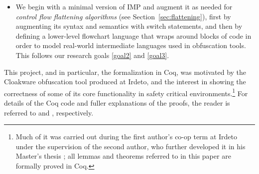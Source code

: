 \documentclass[compsoc,conference,a4paper,10pt,times]{IEEEtran}
\begin{document}
\begin{itemize}
   \item We begin with a minimal version of IMP and augment it as needed for \emph{control flow flattening algorithms} (see Section~\ref{sec:flattening}),
   first by augmenting its syntax and semantics with switch statements, and then by defining a lower-level flowchart language that wraps around blocks of code in order to model real-world intermediate languages used in obfuscation tools. This follows our research goals \ref{goal2} and \ref{goal3}. \label{itm:3}
\end{itemize}

This project, and in particular, the formalization in Coq, was motivated by the Cloakware obfuscation tool produced at Irdeto, and the interest in showing the correctness of some of its core functionality in safety critical environments.\footnote{Much of it was carried out during the first author's co-op term at Irdeto under the supervision of the second author, who further developed it in his Master's thesis \cite{Weiyun}; all lemmas and theorems referred to in this paper are formally proved in Coq.} For details of the Coq code and fuller explanations of the proofs, the reader is referred to \cite{WeiRepo} and \cite{Weiyun}, respectively.


\end{document}

